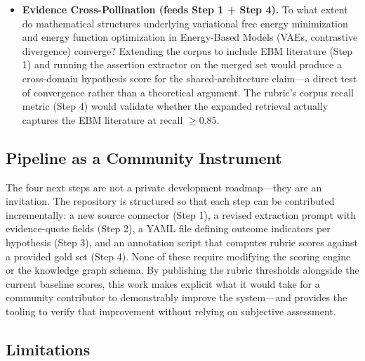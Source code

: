 \documentclass[
  english,
]{article}
\begin{document}
{{{{{{{{{{{{{{{{\begin{itemize}
  low-dimensional discrete environments). Beyond what state-space
  dimensionality and reward density does the expected-free-energy
  exploration advantage of model-based AIF degrade relative to
  model-free architectures such as SAC or PPO? Answering this requires
  assembling the outcome-indicator-tagged evidence (Step 3) and
  identifying which benchmark comparisons are already in the literature
  versus which are genuinely absent.
\item
  \textbf{Evidence Cross-Pollination (feeds Step 1 + Step 4).} To what
  extent do mathematical structures underlying variational free energy
  minimization and energy function optimization in Energy-Based Models
  (VAEs, contrastive divergence) converge? Extending the corpus to
  include EBM literature (Step 1) and running the assertion extractor on
  the merged set would produce a cross-domain hypothesis score for the
  shared-architecture claim---a direct test of convergence rather than a
  theoretical argument. The rubric's corpus recall metric (Step 4) would
  validate whether the expanded retrieval actually captures the EBM
  literature at recall \(\geq 0.85\).
\end{itemize}

\subsection{Pipeline as a Community
Instrument}\label{pipeline-as-a-community-instrument}

The four next steps are not a private development roadmap---they are an
invitation. The repository is structured so that each step can be
contributed incrementally: a new source connector (Step 1), a revised
extraction prompt with evidence-quote fields (Step 2), a YAML file
defining outcome indicators per hypothesis (Step 3), and an annotation
script that computes rubric scores against a provided gold set (Step 4).
None of these require modifying the scoring engine or the knowledge
graph schema. By publishing the rubric thresholds alongside the current
baseline scores, this work makes explicit what it would take for a
community contributor to demonstrably improve the system---and provides
the tooling to verify that improvement without relying on subjective
assessment.

\subsection{Limitations}\label{limitations-1}

}}}}}}}}}}}}}}}}
\end{document}
